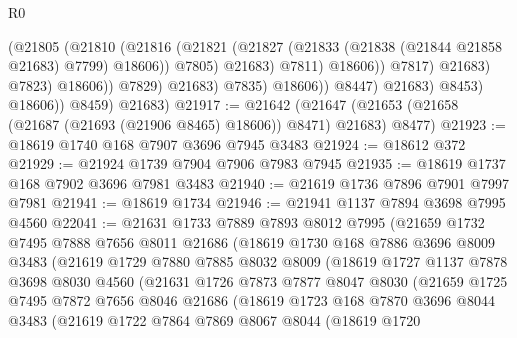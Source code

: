 \begin{lexlean}{R0}
\begin{coremodule}
                                        (@21805
                                          (@21810
                                            (@21816
                                              (@21821
                                                (@21827
                                                  (@21833
                                                    (@21838 (@21844 @21858 @21683) @7799)
                                                    @18606))
                                                @7805)
                                              @21683)
                                            @7811)
                                          @18606))
                                      @7817)
                                    @21683)
                                  @7823)
                                @18606))
                            @7829)
                          @21683)
                        @7835)
                      @18606))
                  @8447)
                @21683)
              @8453)
            @18606))
        @8459)
      @21683)
@21917 := @21642
    (@21647 (@21653 (@21658 (@21687 (@21693 (@21906 @8465) @18606)) @8471) @21683) @8477)
@21923 := @18619 @1740 @168 @7907 @3696 @7945 @3483
@21924 := @18612 @372
@21929 := @21924 @1739 @7904 @7906 @7983 @7945
@21935 := @18619 @1737 @168 @7902 @3696 @7981 @3483
@21940 := @21619 @1736 @7896 @7901 @7997 @7981
@21941 := @18619 @1734
@21946 := @21941 @1137 @7894 @3698 @7995 @4560
@22041 := @21631
    @1733
    @7889
    @7893
    @8012
    @7995
    (@21659
      @1732
      @7495
      @7888
      @7656
      @8011
      @21686
      (@18619
        @1730
        @168
        @7886
        @3696
        @8009
        @3483
        (@21619
          @1729
          @7880
          @7885
          @8032
          @8009
          (@18619
            @1727
            @1137
            @7878
            @3698
            @8030
            @4560
            (@21631
              @1726
              @7873
              @7877
              @8047
              @8030
              (@21659
                @1725
                @7495
                @7872
                @7656
                @8046
                @21686
                (@18619
                  @1723
                  @168
                  @7870
                  @3696
                  @8044
                  @3483
                  (@21619
                    @1722
                    @7864
                    @7869
                    @8067
                    @8044
                    (@18619
                      @1720

\end{coremodule}
\end{lexlean}
